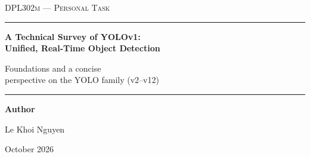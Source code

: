\documentclass[11pt,a4paper]{article}
\begin{document}
\begin{titlepage}
  \centering
  \vspace*{1.2cm}
  {\Large\textsc{DPL302m --- Personal Task}\par}
  \vspace{1.5cm}
  {\color{AccentBlue}\rule{\linewidth}{1.2pt}\par}
  \vspace{0.55cm}
  {\LARGE\bfseries A Technical Survey of YOLOv1:\\[0.25em]
  Unified, Real-Time Object Detection\par}
  \vspace{0.45cm}
  {\large Foundations and a concise\\
  perspective on the YOLO family (v2--v12)\par}
  \vspace{0.55cm}
  {\color{AccentBlue}\rule{\linewidth}{1.2pt}\par}
  \vspace{1.7cm}
  {\large\textbf{Author}\par}
  \vspace{0.25cm}
  {\Large Le Khoi Nguyen\par}
  \vfill
  {\large October 2026\par}
\end{titlepage}
\clearpage
{}
\setcounter{page}{1}

\begin{abstract}
You Only Look Once (YOLO) reframed object detection as a unified regression problem: a single neural network maps an entire image directly to bounding boxes and class probabilities. This report studies the original YOLOv1 paper, published at CVPR 2016, as its primary model. It explains the problem motivation, grid-based prediction, the 24-convolutional-layer architecture, responsibility assignment, training objective, and inference pipeline. The analysis connects the model's innovations to its speed, contextual reasoning, localization errors, and difficulty with clustered small objects. A shorter historical section explains how subsequent YOLO branches address representation, training, deployment, and attention, supported by a version catalogue in the appendix. The original model occupies approximately four-fifths of the main technical discussion. The implementation section and spaces for an architecture illustration and real-image inference results are reserved for later completion.
\end{abstract}
\end{document}
